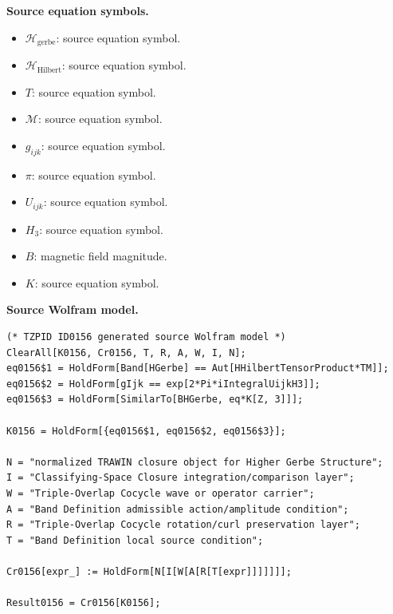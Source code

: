 \begin{minipage}[t]{0.49\linewidth}
\begingroup
\small
\raggedright
\textbf{Source equation symbols.}\par
\begin{itemize}[leftmargin=1.35em,itemsep=1pt,topsep=1pt,parsep=0pt]
    \item $\mathcal{H}_{\mathrm{gerbe}}$: source equation symbol.
    \item $\mathcal{H}_{\mathrm{Hilbert}}$: source equation symbol.
    \item $T$: source equation symbol.
    \item $\mathcal{M}$: source equation symbol.
    \item $g_{ijk}$: source equation symbol.
    \item $\pi$: source equation symbol.
    \item $U_{ijk}$: source equation symbol.
    \item $H_3$: source equation symbol.
    \item $B$: magnetic field magnitude.
    \item $K$: source equation symbol.
\end{itemize}
\endgroup
\end{minipage}\hfill
\begin{minipage}[t]{0.47\linewidth}
\begingroup
\scriptsize
\raggedright
\textbf{Source Wolfram model.}\par
\begin{Verbatim}[fontsize=\tiny,breaklines=true,breakanywhere=true]
(* TZPID ID0156 generated source Wolfram model *)
ClearAll[K0156, Cr0156, T, R, A, W, I, N];
eq0156$1 = HoldForm[Band[HGerbe] == Aut[HHilbertTensorProduct*TM]];
eq0156$2 = HoldForm[gIjk == exp[2*Pi*iIntegralUijkH3]];
eq0156$3 = HoldForm[SimilarTo[BHGerbe, eq*K[Z, 3]]];

K0156 = HoldForm[{eq0156$1, eq0156$2, eq0156$3}];

N = "normalized TRAWIN closure object for Higher Gerbe Structure";
I = "Classifying-Space Closure integration/comparison layer";
W = "Triple-Overlap Cocycle wave or operator carrier";
A = "Band Definition admissible action/amplitude condition";
R = "Triple-Overlap Cocycle rotation/curl preservation layer";
T = "Band Definition local source condition";

Cr0156[expr_] := HoldForm[N[I[W[A[R[T[expr]]]]]]];

Result0156 = Cr0156[K0156];
\end{Verbatim}
\endgroup
\end{minipage}

